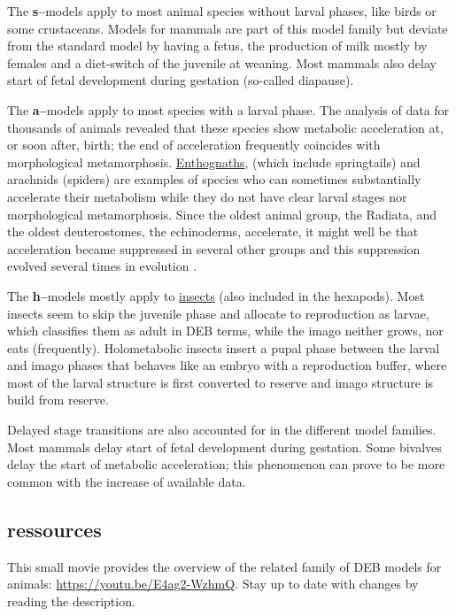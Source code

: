 The \textbf{s--}models apply to most animal species without larval phases, like birds or some crustaceans. 
Models for mammals are part of this model family but deviate from the standard model by having a fetus, the production of milk mostly by females and a diet-switch of the juvenile at weaning. 
Most mammals also delay start of fetal development during gestation (so-called diapause).

The \textbf{a--}models apply to most species with a larval phase. 
The analysis of data for thousands of animals revealed that these species show metabolic acceleration at, or soon after, birth; 
the end of acceleration frequently coincides with morphological metamorphosis.
\href{https://en.wikipedia.org/wiki/Entognatha}{Enthognaths}, (which include springtails) and arachnids (spiders) are examples of species who can sometimes substantially accelerate their metabolism while they do not have clear larval stages nor morphological metamorphosis.
Since the oldest animal group, the Radiata, and the oldest deuterostomes, the echinoderms, accelerate, it might well be that acceleration became  suppressed in several other groups and this suppression evolved several times in evolution \cite{Kooy2014}. 

The \textbf{h--}models mostly apply to \href{https://en.wikipedia.org/wiki/Insect}{insects} (also included in the hexapods). Most insects seem to skip the juvenile phase and allocate to reproduction as larvae, which classifies them as adult in DEB terms, while the imago neither grows, nor eats (frequently).
Holometabolic insects insert a pupal phase between the larval and imago phases that behaves like an embryo with a reproduction buffer, where most of the larval structure is first converted to reserve \cite{LlanMarq2015} and imago structure is build from reserve.

Delayed stage transitions are also accounted for in the different model families. 
Most mammals delay start of fetal development during gestation. 
Some bivalves delay the start of metabolic acceleration; 
this phenomenon can prove to be more common with the increase of available data.

\subsection{ressources}

This small movie provides the overview of the related family of DEB models for animals: \url{https://youtu.be/E4ag2-WzhmQ}. Stay up to date with changes by reading the description.